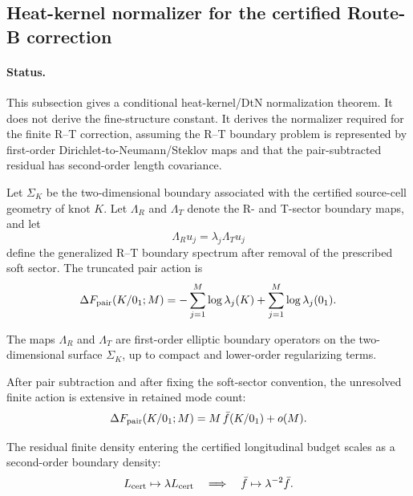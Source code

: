
\subsection{Heat-kernel normalizer for the certified Route-B correction}

\paragraph{Status.}
This subsection gives a conditional heat-kernel/DtN normalization theorem.
It does not derive the fine-structure constant.  It derives the normalizer
required for the finite R--T correction, assuming the R--T boundary problem is
represented by first-order Dirichlet-to-Neumann/Steklov maps and that the
pair-subtracted residual has second-order length covariance.

Let \(\Sigma_K\) be the two-dimensional boundary associated with the certified
source-cell geometry of knot \(K\).  Let \(\Lambda_R\) and \(\Lambda_T\) denote
the R- and T-sector boundary maps, and let
\[
\Lambda_R u_j=\lambda_j \Lambda_T u_j
\]
define the generalized R--T boundary spectrum after removal of the prescribed
soft sector.  The truncated pair action is
\[
\Delta F_{\rm pair}(K/0_1;M)
=
-\sum_{j=1}^M \log\lambda_j(K)
+
\sum_{j=1}^M \log\lambda_j(0_1).
\]

\begin{assumption}
The maps \(\Lambda_R\) and \(\Lambda_T\) are first-order elliptic boundary
operators on the two-dimensional surface \(\Sigma_K\), up to compact and
lower-order regularizing terms.
\end{assumption}

\begin{assumption}
After pair subtraction and after fixing the soft-sector convention, the
unresolved finite action is extensive in retained mode count:
\[
\Delta F_{\rm pair}(K/0_1;M)=M\,\bar f(K/0_1)+o(M).
\]
\end{assumption}

\begin{assumption}
The residual finite density entering the certified longitudinal budget scales
as a second-order boundary density:
\[
L_{\rm cert}\mapsto \lambda L_{\rm cert}
\quad\Longrightarrow\quad
\bar f\mapsto \lambda^{-2}\bar f .
\]
\end{assumption}

